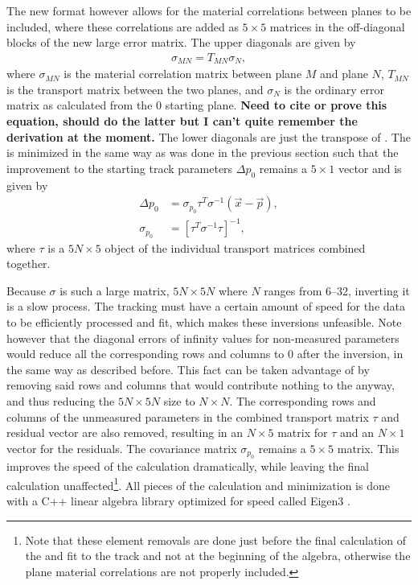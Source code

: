 The new format however allows for the material correlations between planes to be included, where these correlations are added as $5 \times 5$ matrices in the off-diagonal blocks of the new large error matrix. The upper diagonals are given by 
    \begin{align} \label{eq:corr}
        \sigma_{MN} = T_{MN} \sigma_{N}, 
    \end{align}
where $\sigma_{MN}$ is the material correlation matrix between plane $M$ and plane $N$, $T_{MN}$ is the transport matrix between the two planes, and $\sigma_{N}$ is the ordinary error matrix as calculated from the 0 starting plane. \textbf{Need to cite or prove this equation, should do the latter but I can't quite remember the derivation at the moment.} The lower diagonals are just the transpose of . The \chisq is minimized in the same way as was done in the previous section such that the improvement to the starting track parameters $\Delta p_{0}$ remains a $5 \times 1$ vector and is given by
    \begin{align} \label{eq:deltafull}
        \Delta p_{0} &= \sigma_{p_{0}} \tau^{T}\sigma^{-1}(\vec{x}-\vec{p}), \\
        \sigma_{p_{0}} &= [\tau^{T} \sigma^{-1} \tau ]^{-1},
    \end{align}
where $\tau$ is a $5N \times 5$ object of the individual transport matrices combined together.




Because $\sigma$ is such a large matrix, $5N \times 5N$ where $N$ ranges from \SIrange{6}{32}{}, inverting it is a slow process. The tracking must have a certain amount of speed for the data to be efficiently processed and fit, which makes these inversions unfeasible. Note however that the diagonal errors of infinity values for non-measured parameters would reduce all the corresponding rows and columns to 0 after the inversion, in the same way as described before. This fact can be taken advantage of by removing said rows and columns that would contribute nothing to the \chisq anyway, and thus reducing the $5N \times 5N$ size to $N \times N$. The corresponding rows and columns of the unmeasured parameters in the combined transport matrix $\tau$ and residual vector are also removed, resulting in an $N \times 5$ matrix for $\tau$ and an $N \times 1$ vector for the residuals. The covariance matrix $\sigma_{p_{0}}$ remains a $5 \times 5$ matrix. This improves the speed of the \chisq calculation dramatically, while leaving the final calculation unaffected\footnote{Note that these element removals are done just before the final calculation of the \chisq and fit to the track and not at the beginning of the algebra, otherwise the plane material correlations are not properly included.}. All pieces of the \chisq calculation and minimization is done with a C++ linear algebra library optimized for speed called Eigen3 \cite{eigenweb}.

